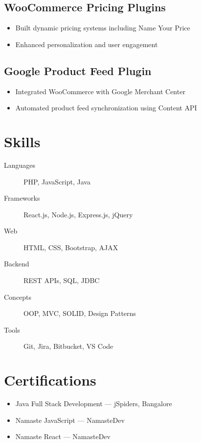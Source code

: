 \documentclass{article}
\begin{document}
\subsection{WooCommerce Pricing Plugins}
\begin{itemize}
\item Built dynamic pricing systems including Name Your Price
\item Enhanced personalization and user engagement
\end{itemize}

\subsection{Google Product Feed Plugin}
\begin{itemize}
\item Integrated WooCommerce with Google Merchant Center
\item Automated product feed synchronization using Content API
\end{itemize}

\section{\faCogs\enspace Skills}
\begin{description}
\item[Languages] PHP, JavaScript, Java
\item[Frameworks] React.js, Node.js, Express.js, jQuery
\item[Web] HTML, CSS, Bootstrap, AJAX
\item[Backend] REST APIs, SQL, JDBC
\item[Concepts] OOP, MVC, SOLID, Design Patterns
\item[Tools] Git, Jira, Bitbucket, VS Code
\end{description}

\section{\faCertificate\enspace Certifications}
\begin{itemize}
\item Java Full Stack Development — jSpiders, Bangalore
\item Namaste JavaScript — NamasteDev
\item Namaste React — NamasteDev
\end{itemize}
\end{document}
